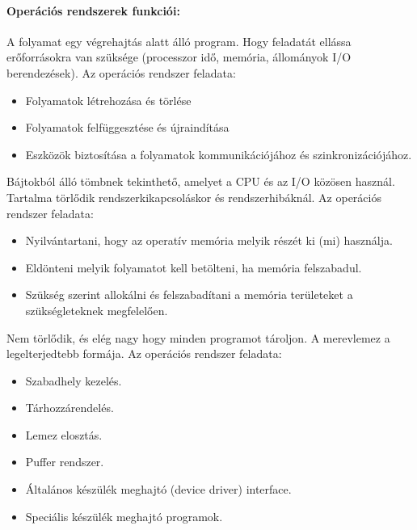 \paragraph{Operációs rendszerek funkciói:}
\begin{description}[nosep]
\item[Folyamatkezelés]
A folyamat egy végrehajtás alatt álló program. Hogy feladatát ellássa erőforrásokra van szüksége (processzor idő, memória, állományok I/O berendezések).
Az operációs rendszer feladata:
\begin{itemize}[nosep]
	\item Folyamatok létrehozása és törlése
	\item Folyamatok felfüggesztése és újraindítása
	\item Eszközök biztosítása a folyamatok kommunikációjához és szinkronizációjához.
\end{itemize}
\item[Memória (főtár) kezelés]
Bájtokból álló tömbnek tekinthető, amelyet a CPU és az I/O közösen használ. Tartalma törlődik rendszerkikapcsoláskor és rendszerhibáknál.
Az operációs rendszer feladata:
\begin{itemize}[nosep]
	\item Nyilvántartani, hogy az operatív memória melyik részét ki (mi) használja.
	\item Eldönteni melyik folyamatot kell betölteni, ha memória felszabadul.
	\item Szükség szerint allokálni és felszabadítani a memória területeket a szükségleteknek megfelelően.
\end{itemize}
\item[Másodlagos tárkezelés]
Nem törlődik, és elég nagy hogy minden programot tároljon. A merevlemez a legelterjedtebb
formája. Az operációs rendszer feladata:
\begin{itemize}[nosep]
	\item Szabadhely kezelés.
	\item Tárhozzárendelés.
	\item Lemez elosztás.
\end{itemize}
\item[I/O rendszerkezelés]
\begin{itemize}[nosep]
	\item Puffer rendszer.
	\item Általános készülék meghajtó (device driver) interface.
	\item Speciális készülék meghajtó programok.
\end{itemize}

\end{description}
